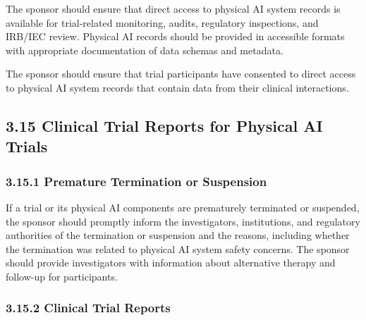 \documentclass[11pt]{article}
\begin{document}
\begin{description}[leftmargin=2.5cm,style=sameline]

\item[(a)] The sponsor should ensure that direct access to physical AI system records is available for trial-related monitoring, audits, regulatory inspections, and IRB/IEC review. Physical AI records should be provided in accessible formats with appropriate documentation of data schemas and metadata.

\item[(b)] The sponsor should ensure that trial participants have consented to direct access to physical AI system records that contain data from their clinical interactions.

\end{description}

\subsection{3.15 Clinical Trial Reports for Physical AI Trials}

\subsubsection{3.15.1 Premature Termination or Suspension}

If a trial or its physical AI components are prematurely terminated or suspended, the sponsor should promptly inform the investigators, institutions, and regulatory authorities of the termination or suspension and the reasons, including whether the termination was related to physical AI system safety concerns. The sponsor should provide investigators with information about alternative therapy and follow-up for participants.

\subsubsection{3.15.2 Clinical Trial Reports}
\end{document}
